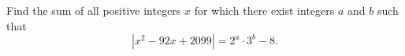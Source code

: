 Find the sum of all positive integers $x$ for which there exist integers $a$ and $b$ such that
\[\left|x^2-92x+2099\right|=2^a\cdot3^b-8 .\]
